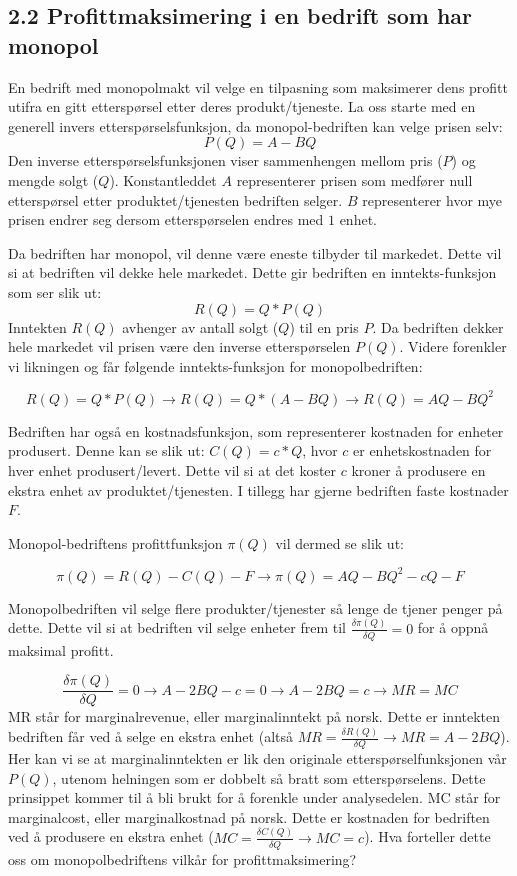 \documentclass[
  12pt,
  a4paper,
  DIV=11,
  numbers=noendperiod]{scrartcl}
\begin{document}
\subsection{2.2 Profittmaksimering i en bedrift som har
monopol}\label{profittmaksimering-i-en-bedrift-som-har-monopol}

En bedrift med monopolmakt vil velge en tilpasning som maksimerer dens
profitt utifra en gitt etterspørsel etter deres produkt/tjeneste. La oss
starte med en generell invers etterspørselsfunksjon, da
monopol-bedriften kan velge prisen selv: \[ P(Q) = A - BQ\]Den inverse
etterspørselsfunksjonen viser sammenhengen mellom pris (\(P\)) og mengde
solgt (\(Q\)). Konstantleddet \(A\) representerer prisen som medfører
null etterspørsel etter produktet/tjenesten bedriften selger. \(B\)
representerer hvor mye prisen endrer seg dersom etterspørselen endres
med \(1\) enhet.

Da bedriften har monopol, vil denne være eneste tilbyder til markedet.
Dette vil si at bedriften vil dekke hele markedet. Dette gir bedriften
en inntekts-funksjon som ser slik ut: \[R(Q) = Q * P(Q)\]Inntekten
\(R(Q)\) avhenger av antall solgt (\(Q\)) til en pris \(P\). Da
bedriften dekker hele markedet vil prisen være den inverse
etterspørselen \(P(Q)\). Videre forenkler vi likningen og får følgende
inntekts-funksjon for monopolbedriften:

\[R(Q) = Q * P(Q) \rightarrow R(Q) = Q * (A-BQ) \rightarrow R(Q) = AQ -BQ^2\]

Bedriften har også en kostnadsfunksjon, som representerer kostnaden for
enheter produsert. Denne kan se slik ut: \(C(Q) = c * Q\), hvor \(c\) er
enhetskostnaden for hver enhet produsert/levert. Dette vil si at det
koster \(c\) kroner å produsere en ekstra enhet av produktet/tjenesten.
I tillegg har gjerne bedriften faste kostnader \(F\).

Monopol-bedriftens profittfunksjon \(\pi(Q)\) vil dermed se slik ut:

\[\pi(Q) = R(Q) - C(Q) - F \rightarrow \pi(Q) = AQ - BQ^2 - cQ - F\]

Monopolbedriften vil selge flere produkter/tjenester så lenge de tjener
penger på dette. Dette vil si at bedriften vil selge enheter frem til
\(\frac{\delta\pi(Q)}{\delta Q} = 0\) for å oppnå maksimal profitt.

\[\frac{\delta\pi(Q)}{\delta Q} = 0 \rightarrow A-2BQ - c = 0 \rightarrow A - 2BQ = c \rightarrow MR = MC\]MR
står for marginalrevenue, eller marginalinntekt på norsk. Dette er
inntekten bedriften får ved å selge en ekstra enhet (altså
\(MR = \frac{\delta R(Q)}{\delta Q} \rightarrow MR = A-2BQ\)). Her kan
vi se at marginalinntekten er lik den originale etterspørselfunksjonen
vår \(P(Q)\), utenom helningen som er dobbelt så bratt som
etterspørselens. Dette prinsippet kommer til å bli brukt for å forenkle
under analysedelen. MC står for marginalcost, eller marginalkostnad på
norsk. Dette er kostnaden for bedriften ved å produsere en ekstra enhet
(\(MC = \frac{\delta C(Q)}{\delta Q} \rightarrow MC = c\)). Hva
forteller dette oss om monopolbedriftens vilkår for profittmaksimering?
\end{document}
